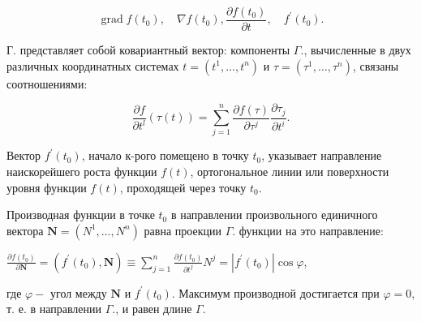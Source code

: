 \documentclass[10pt]{article}
\begin{document}
\[

\operatorname{grad} f\left(t_{0}\right), \quad \nabla f\left(t_{0}\right), \frac{\partial f\left(t_{0}\right)}{\partial t}, \quad f^{\prime}\left(t_{0}\right) .

\]



Г. представляет собой ковариантный вектор: компоненты $\Gamma$., вычисленные в двух различных координатных системах $t=\left(t^{1}, \ldots, t^{n}\right)$ и $\tau=\left(\tau^{1}, \ldots, \tau^{n}\right)$, связаны соотношениями:



\[

\frac{\partial f}{\partial t^{l}}(\tau(t))=\sum_{j=1}^{n} \frac{\partial f(\tau)}{\partial \tau^{j}} \frac{\partial \tau_{j}}{\partial t^{i}} .

\]



Вектор $f^{\prime}\left(t_{0}\right)$, начало к-рого помещено в точку $t_{0}$, указывает направление наискорейшего роста функции $f(t)$, ортогональное линии или поверхности уровня функции $f(t)$, проходящей через точку $t_{0}$.



Производная функции в точке $t_{0}$ в направлении произвольного единичного вектора $\boldsymbol{N}=\left(N^{1}, \ldots, N^{n}\right)$ равна проекции $\Gamma$. функции на это направление:



$\frac{\partial f\left(t_{0}\right)}{\partial \mathbf{N}}=\left(f^{\prime}\left(t_{0}\right), \boldsymbol{N}\right) \equiv \sum_{j=1}^{n} \frac{\partial f\left(t_{0}\right)}{\partial t^{j}} N^{j}=\left|f^{\prime}\left(t_{0}\right)\right| \cos \varphi$,



где $\varphi-$ угол между $\boldsymbol{N}$ и $f^{\prime}\left(t_{0}\right)$. Максимум производной достигается при $\varphi=0$, т. е. в направлении $\Gamma$., и равен длине $\Gamma$.
\end{document}
